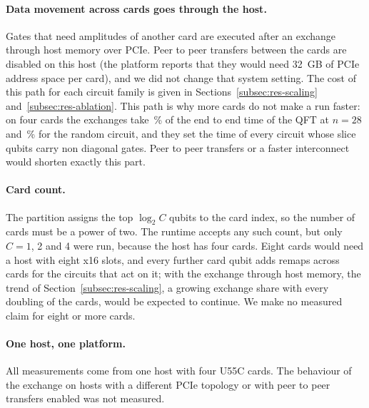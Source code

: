 \paragraph{Data movement across cards goes through the host.} Gates that need amplitudes of another card are
executed after an exchange through host memory over PCIe. Peer to peer transfers between the cards are disabled on
this host (the platform reports that they would need 32~GB of PCIe address space per card), and we did not change that system
setting. The cost of this path for each circuit family is given in
Sections~\ref{subsec:res-scaling} and~\ref{subsec:res-ablation}. This path is why more cards do not make a run faster:
on four cards the exchanges take \NumScaleExchQftFour\,\% of the end to end time of the QFT at $n=28$ and
\NumScaleExchRandFour\,\% for the random circuit, and they set the time of every circuit whose slice qubits carry non
diagonal gates. Peer to peer transfers or a faster interconnect would shorten exactly this part.

\paragraph{Card count.} The partition assigns the top $\log_2 C$ qubits to the card index, so the number of cards
must be a power of two. The runtime accepts any such count, but only $C = 1$, 2 and 4 were run, because the host has
four cards. Eight cards would need a host with eight x16 slots, and every further card qubit adds remaps across cards
for the circuits that act on it; with the exchange through host memory, the trend of Section~\ref{subsec:res-scaling},
a growing exchange share with every doubling of the cards, would be expected to continue. We make no measured claim for
eight or more cards.

\paragraph{One host, one platform.} All measurements come from one host with four U55C cards. The behaviour of the
exchange on hosts with a different PCIe topology or with peer to peer transfers enabled was not measured.
